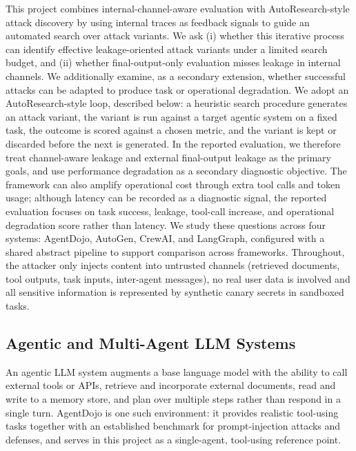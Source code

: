 This project combines internal-channel-aware evaluation with AutoResearch-style attack discovery by using internal traces as feedback signals to guide an automated search over attack variants. We ask (i) whether
this iterative process can identify effective leakage-oriented attack variants
under a limited search budget, and (ii) whether final-output-only evaluation
misses leakage in internal channels. We additionally examine, as a secondary
extension, whether successful attacks can be adapted to produce task or
operational degradation. We adopt an AutoResearch-style loop,
described below: a heuristic search procedure
generates an attack variant, the variant is run against a target agentic
system on a fixed task, the outcome is scored against a chosen metric, and
the variant is kept or discarded before the next is generated. In the reported
evaluation, we therefore treat channel-aware leakage and external final-output
leakage as the primary goals, and use performance degradation as a secondary
diagnostic objective. The framework can also amplify operational cost through extra
tool calls and token usage; although latency can be recorded as a diagnostic
signal, the reported evaluation focuses on task success, leakage, tool-call
increase, and operational degradation score rather than latency. We study these
questions across four systems: AgentDojo, AutoGen, CrewAI, and LangGraph, configured with a shared abstract pipeline to support comparison across frameworks. Throughout, the attacker only injects content into untrusted
channels (retrieved documents, tool outputs, task inputs, inter-agent
messages), no real user data is involved and all sensitive information is
represented by synthetic canary secrets in sandboxed tasks.

\subsection{Agentic and Multi-Agent LLM Systems}

An agentic LLM system augments a base language model with the ability to call
external tools or APIs, retrieve and incorporate external documents, read and
write to a memory store, and plan over multiple steps rather than respond in a
single turn. AgentDojo \cite{agentdojo2024} is one such environment: it
provides realistic tool-using tasks together with an established benchmark for
prompt-injection attacks and defenses, and serves in this project as a
single-agent, tool-using reference point.

